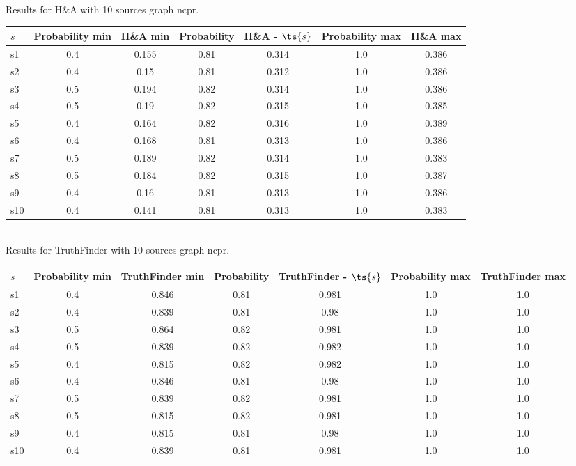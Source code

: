 \documentclass{article}
\begin{document}
\noindent Results for H\&A with 10 sources graph ncpr.

\noindent\begin{tabular}{|l|c|c|c|c|c|c|}
\hline
$s$& Probability min & H\&A min & Probability & H\&A - $\ts{s}$ & Probability max & H\&A max\\
\hline
s1 &0.4 & 0.155 & 0.81 & 0.314 & 1.0 & 0.386\\
\hline
s2 &0.4 & 0.15 & 0.81 & 0.312 & 1.0 & 0.386\\
\hline
s3 &0.5 & 0.194 & 0.82 & 0.314 & 1.0 & 0.386\\
\hline
s4 &0.5 & 0.19 & 0.82 & 0.315 & 1.0 & 0.385\\
\hline
s5 &0.4 & 0.164 & 0.82 & 0.316 & 1.0 & 0.389\\
\hline
s6 &0.4 & 0.168 & 0.81 & 0.313 & 1.0 & 0.386\\
\hline
s7 &0.5 & 0.189 & 0.82 & 0.314 & 1.0 & 0.383\\
\hline
s8 &0.5 & 0.184 & 0.82 & 0.315 & 1.0 & 0.387\\
\hline
s9 &0.4 & 0.16 & 0.81 & 0.313 & 1.0 & 0.386\\
\hline
s10 &0.4 & 0.141 & 0.81 & 0.313 & 1.0 & 0.383\\
\hline
\end{tabular}\\

\noindent Results for TruthFinder with 10 sources graph ncpr.

\noindent\begin{tabular}{|l|c|c|c|c|c|c|}
\hline
$s$& Probability min & TruthFinder min & Probability & TruthFinder - $\ts{s}$ & Probability max & TruthFinder max\\
\hline
s1 &0.4 & 0.846 & 0.81 & 0.981 & 1.0 & 1.0\\
\hline
s2 &0.4 & 0.839 & 0.81 & 0.98 & 1.0 & 1.0\\
\hline
s3 &0.5 & 0.864 & 0.82 & 0.981 & 1.0 & 1.0\\
\hline
s4 &0.5 & 0.839 & 0.82 & 0.982 & 1.0 & 1.0\\
\hline
s5 &0.4 & 0.815 & 0.82 & 0.982 & 1.0 & 1.0\\
\hline
s6 &0.4 & 0.846 & 0.81 & 0.98 & 1.0 & 1.0\\
\hline
s7 &0.5 & 0.839 & 0.82 & 0.981 & 1.0 & 1.0\\
\hline
s8 &0.5 & 0.815 & 0.82 & 0.981 & 1.0 & 1.0\\
\hline
s9 &0.4 & 0.815 & 0.81 & 0.98 & 1.0 & 1.0\\
\hline
s10 &0.4 & 0.839 & 0.81 & 0.981 & 1.0 & 1.0\\
\hline
\end{tabular}\\
\end{document}
